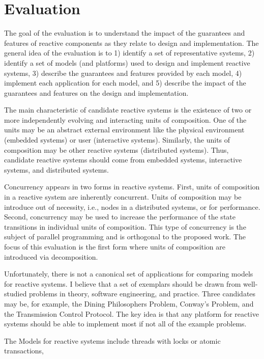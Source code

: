 \documentclass[letterpaper]{article}
\begin{document}
\section{Evaluation}

The goal of the evaluation is to understand the impact of the guarantees and features of reactive components as they relate to design and implementation.
The general idea of the evaluation is to 1) identify a set of representative systems, 2) identify a set of models (and platforms) used to design and implement reactive systems, 3) describe the guarantees and features provided by each model, 4) implement each application for each model, and 5) describe the impact of the guarantees and features on the design and implementation.

The main characteristic of candidate reactive systems is the existence of two or more independently evolving and interacting units of composition.
One of the units may be an abstract external environment like the physical environment (embedded systems) or user (interactive systems).
Similarly, the units of composition may be other reactive systems (distributed systems).
Thus, candidate reactive systems should come from embedded systems, interactive systems, and distributed systems.

Concurrency appears in two forms in reactive systems.
First, units of composition in a reactive system are inherently concurrent.
Units of composition may be introduce out of necessity, i.e., nodes in a distributed systems, or for performance.
Second, concurrency may be used to increase the performance of the state transitions in individual units of composition.
This type of concurrency is the subject of parallel programming and is orthogonal to the proposed work.
The focus of this evaluation is the first form where units of composition are introduced via decomposition.

Unfortunately, there is not a canonical set of applications for comparing models for reactive systems.
I believe that a set of exemplars should be drawn from well-studied problems in theory, software engineering, and practice.
Three candidates may be, for example, the Dining Philosophers Problem, Conway's Problem, and the Transmission Control Protocol.
The key idea is that any platform for reactive systems should be able to implement most if not all of the example problems.

The Models for reactive systems include threads with locks or atomic transactions, 
\end{document}
